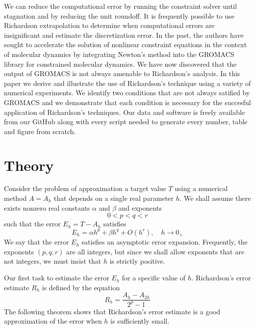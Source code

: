 \documentclass[runningheads]{llncs}
\begin{document}
We can reduce the computational error by running the constraint solver until stagnation and by reducing the unit roundoff.
It is frequently possible to use Richardson extrapolation to determine when computational errors are insignificant and estimate the discretization error.
In the past, the authors have sought to accelerate the solution of nonlinear constraint equations in the context of molecular dynamics by integrating Newton's method into the GROMACS library for constrained molecular dynamics.
We have now discovered that the output of GROMACS is not always amenable to Richardson's analysis.
In this paper we derive and illustrate the use of Richardson's technique using a variety of numerical experiments.
We identify two conditions that are not always satified by GROMACS and we demonstrate that each condition is necessary for the succesful application of Richardson's techniques.
Our data and software is freely available from our GitHub along with every script needed to generate every number, table and figure from scratch.


\section{Theory}

Consider the problem of approximation a target value $T$ using a numerical method $A = A_h$ that depends on a single real parameter $h$. We shall assume there exists nonzero real constants $\alpha$ and $\beta$ and exponents
\begin{equation}
  0 < p < q < r
\end{equation}
such that the error $E_h = T - A_h$ satisfies
\begin{equation} \label{equ:aex}
  E_h  = \alpha h^p + \beta h^q + O(h^r), \quad h \rightarrow 0_+
\end{equation}
We say that the error $E_h$ satisfies an asymptotic error expansion. Frequently, the exponents $(p,q,r)$ are all integers, but since we shall allow exponents that are not integers, we must insist that $h$ is strictly positive.

Our first task to estimate the error $E_h$ for a specific value of $h$. Richardson's error estimate $R_h$ is defined by the equation
\begin{equation}
 R_h =  \frac{A_h - A_{2h}}{2^p - 1}
\end{equation}
The following theorem shows that Richardson's error estimate is a good approximation of the error when $h$ is sufficiently small.
\end{document}
